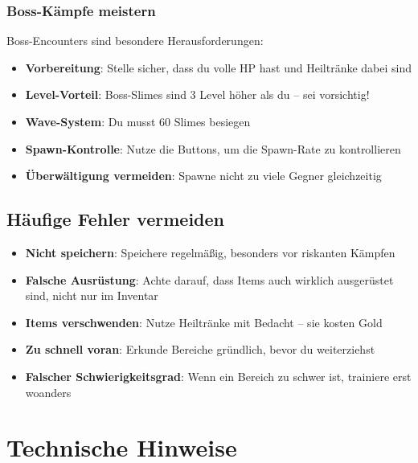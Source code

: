 \documentclass[
  a4paper,
  11pt,
  ngerman,
  parskip=half,
  bibliography=totoc,
  listof=totoc
]{scrreprt}
\begin{document}
\subsection{Boss-Kämpfe meistern}

Boss-Encounters sind besondere Herausforderungen:
\begin{itemize}
    \item \textbf{Vorbereitung}: Stelle sicher, dass du volle \ac{HP} hast und Heiltränke dabei sind
    \item \textbf{Level-Vorteil}: Boss-Slimes sind 3 Level höher als du -- sei vorsichtig!
    \item \textbf{Wave-System}: Du musst 60 Slimes besiegen
    \item \textbf{Spawn-Kontrolle}: Nutze die Buttons, um die Spawn-Rate zu kontrollieren
    \item \textbf{Überwältigung vermeiden}: Spawne nicht zu viele Gegner gleichzeitig
\end{itemize}

\section{Häufige Fehler vermeiden}

\begin{itemize}
    \item \textbf{Nicht speichern}: Speichere regelmäßig, besonders vor riskanten Kämpfen

    \item \textbf{Falsche Ausrüstung}: Achte darauf, dass Items auch wirklich ausgerüstet sind, nicht nur im Inventar

    \item \textbf{Items verschwenden}: Nutze Heiltränke mit Bedacht -- sie kosten Gold

    \item \textbf{Zu schnell voran}: Erkunde Bereiche gründlich, bevor du weiterziehst

    \item \textbf{Falscher Schwierigkeitsgrad}: Wenn ein Bereich zu schwer ist, trainiere erst woanders
\end{itemize}


\chapter{Technische Hinweise}
\end{document}
